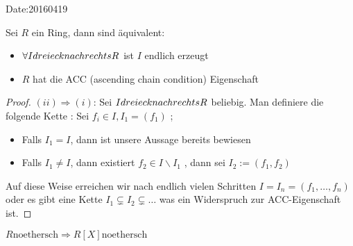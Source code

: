 \begin{bem}
\begin{bsp}
\begin{prop}
\begin{itemize}
\begin{bsp}
Date:20160419
\begin{lem}
Sei \( R \) ein Ring, dann sind \"aquivalent:
\begin{itemize}
\item \( \forall I dreieck nach rechts R \) ist \( I \) endlich erzeugt
\item \( R \) hat die ACC (ascending chain condition) Eigenschaft
\end{itemize}
\begin{proof}
\( (ii) \Rightarrow (i) \): Sei \( I dreieck nach rechts R \) beliebig.
Man definiere die folgende Kette :
Sei \( f_i \in I , I_1 = \left( f_1 \right) \) ; 
\begin{itemize}
\item Falls \( I_1=I \), dann ist unsere Aussage bereits bewiesen
\item Falls \( I_1 \neq I \), dann existiert \( f_2 \in I \backslash I_1 \) , dann sei \( I_2:= \left( f_1 ,f_2 \right) \)
\end{itemize}
Auf diese Weise erreichen wir nach endlich vielen Schritten \( I = I_n = \left( f_1, \dots , f_n \right) \) oder es gibt eine Kette \( I_1 \subsetneq I_2 \subsetneq \dots \) was ein Widerspruch zur ACC-Eigenschaft ist.
\end{proof}
\end{lem}
\begin{satz}
\( R \text{noethersch} \Rightarrow R \left[ X \right] \text{noethersch} \)


\end{satz}
\end{bsp}
\end{itemize}
\end{prop}
\end{bsp}
\end{bem}
